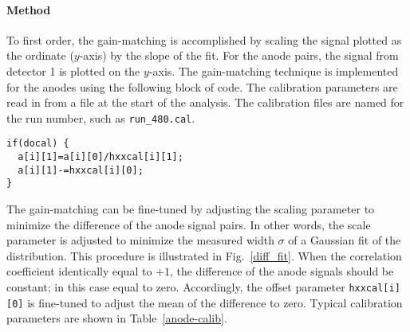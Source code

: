 \paragraph{Method}
To first order, the gain-matching is accomplished by scaling the signal plotted as the ordinate ($y$-axis) by the slope of the fit.  For the anode pairs, the signal from detector 1 is plotted on the $y$-axis.  The gain-matching technique is implemented for the anodes using the following block of code. The calibration parameters are read in from a file at the start of the analysis.  The calibration files are named for the run number, such as \texttt{run\_480.cal}.
\vspace{0.5\baselineskip}
\par\noindent
\begin{minipage}{\linewidth}
  \singlespace
\begin{lstlisting}[caption={Gain-match andode. Here the uncalibrated signal \texttt{a[i][0]} is scaled in two steps.   First, with scaling parameter derived from the slope, \texttt{hxxcal[i][1]}; and then with an offset parameter \texttt{hxxcal[i][0]}.
  The output is saved in \texttt{a[i][1]}.
The fit parameters of each correlation plot are stored in the array \texttt{hxxcal[i][j]}.  The index \texttt{[i]} runs from 0--3 for each of the 3 signal pairs and the index \texttt{[j]} runs from 0--1 for the linear fit parameters; 0 for offset, 1 for slope.}]
if(docal) { 
  a[i][1]=a[i][0]/hxxcal[i][1];	 
  a[i][1]-=hxxcal[i][0];
}
\end{lstlisting}
\end{minipage}


The gain-matching can be fine-tuned by adjusting the scaling parameter to minimize the  difference of the anode signal pairs.  In other words, the scale parameter is adjusted to minimize the measured width $\sigma$ of a Gaussian fit of the distribution.  This procedure is illustrated in Fig.~\ref{diff_fit}.  When the %
 correlation coefficient identically equal to $+1$, the difference of the anode signals should be constant; in this case equal to zero. %
 Accordingly, the offset parameter \texttt{hxxcal[i][0]} is fine-tuned to adjust the mean of the difference to zero. Typical calibration parameters are shown in Table~\ref{anode-calib}.
 
